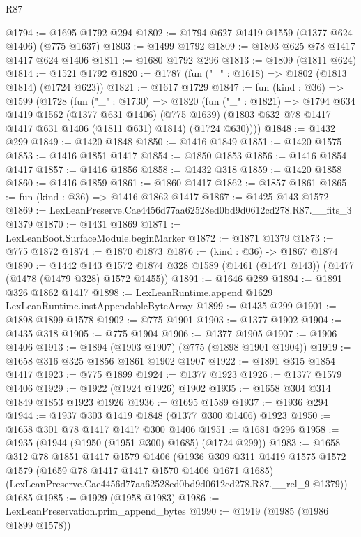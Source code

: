\begin{lexlean}{R87}
\begin{coremodule}
{{@1794 := @1695 @1792 @294
@1802 := @1794 @627 @1419 @1559 (@1377 @624 @1406) (@775 @1637)
@1803 := @1499 @1792
@1809 := @1803 @625 @78 @1417 @1417 @624 @1406
@1811 := @1680 @1792 @296
@1813 := @1809 (@1811 @624)
@1814 := @1521 @1792
@1820 := @1787 (fun ("_" : @1618) => @1802 (@1813 @1814) (@1724 @623))
@1821 := @1617 @1729
@1847 := fun (kind : @36) =>
  @1599
    (@1728
      (fun ("_" : @1730) =>
      @1820
        (fun ("_" : @1821) =>
        @1794
          @634
          @1419
          @1562
          (@1377 @631 @1406)
          (@775 @1639)
          (@1803 @632 @78 @1417 @1417 @631 @1406 (@1811 @631) @1814)
          (@1724 @630))))
@1848 := @1432 @299
@1849 := @1420 @1848
@1850 := @1416 @1849
@1851 := @1420 @1575
@1853 := @1416 @1851 @1417
@1854 := @1850 @1853
@1856 := @1416 @1854 @1417
@1857 := @1416 @1856
@1858 := @1432 @318
@1859 := @1420 @1858
@1860 := @1416 @1859
@1861 := @1860 @1417
@1862 := @1857 @1861
@1865 := fun (kind : @36) => @1416 @1862 @1417
@1867 := @1425 @143 @1572
@1869 := LexLeanPreserve.Cae4456d77aa62528ed0bd9d0612cd278.R87.__fits_3 @1379
@1870 := @1431 @1869
@1871 := LexLeanBoot.SurfaceModule.beginMarker
@1872 := @1871 @1379
@1873 := @775 @1872
@1874 := @1870 @1873
@1876 := (kind : @36) -> @1867 @1874
@1890 := @1442
    @143
    @1572
    @1874
    @328
    @1589
    (@1461 (@1471 @143))
    (@1477 (@1478 (@1479 @328) @1572 @1455))
@1891 := @1646 @289
@1894 := @1891 @326 @1862 @1417
@1898 := LexLeanRuntime.append @1629 LexLeanRuntime.instAppendableByteArray
@1899 := @1435 @299
@1901 := @1898 @1899 @1578
@1902 := @775 @1901
@1903 := @1377 @1902
@1904 := @1435 @318
@1905 := @775 @1904
@1906 := @1377 @1905
@1907 := @1906 @1406
@1913 := @1894 (@1903 @1907) (@775 (@1898 @1901 @1904))
@1919 := @1658 @316 @325 @1856 @1861 @1902 @1907
@1922 := @1891 @315 @1854 @1417
@1923 := @775 @1899
@1924 := @1377 @1923
@1926 := @1377 @1579 @1406
@1929 := @1922 (@1924 @1926) @1902
@1935 := @1658 @304 @314 @1849 @1853 @1923 @1926
@1936 := @1695 @1589
@1937 := @1936 @294
@1944 := @1937 @303 @1419 @1848 (@1377 @300 @1406) @1923
@1950 := @1658 @301 @78 @1417 @1417 @300 @1406
@1951 := @1681 @296
@1958 := @1935 (@1944 (@1950 (@1951 @300) @1685) (@1724 @299))
@1983 := @1658
    @312
    @78
    @1851
    @1417
    @1579
    @1406
    (@1936
      @309
      @311
      @1419
      @1575
      @1572
      @1579
      (@1659 @78 @1417 @1417 @1570 @1406 @1671 @1685)
      (LexLeanPreserve.Cae4456d77aa62528ed0bd9d0612cd278.R87.__rel_9 @1379))
    @1685
@1985 := @1929 (@1958 @1983)
@1986 := LexLeanPreservation.prim_append_bytes
@1990 := @1919 (@1985 (@1986 @1899 @1578))
}}
\end{coremodule}
\end{lexlean}

